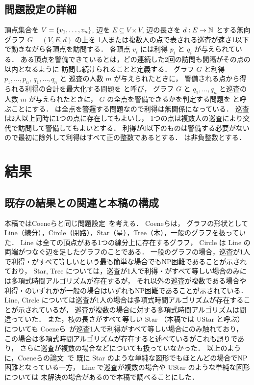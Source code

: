 \subsection{問題設定の詳細}
頂点集合を $V = \left\{{ v_1, \ldots, v_n }\right\}$,
辺を $E \subseteq V \times V$, 
辺の長さを $d : E \to \mathbb{N}$ とする無向グラフ $G = (V,E,d)$ の上を
1人または複数人の点で表される巡査が速さ1以下で動きながら各頂点を訪問する．
各頂点 $v_i$ には利得 $p_i$ と{\timelimit} $q_i$ が与えられている．
ある頂点を警備できているとは，どの連続した2回の訪問も間隔がその点の{\timelimit}以内となるように
訪問し続けられることと定義する．
グラフ $G$ と利得 $p_1, \ldots, p_n$, {\timelimit} $q_1, \ldots, q_n$ と
巡査の人数 $m$ が与えられたときに，
警備される点から得られる利得の合計を最大化する問題を
\optpp と呼び，
グラフ $G$ と{\timelimit} $q_1, \ldots, q_n$ と巡査の人数 $m$ が与えられたときに，
$G$ の全点を警備できるかを判定する問題を \decisionpp と呼ぶことにする．
\decisionpp は全点を警邏する問題なので利得は無関係になっている．
巡査は2人以上同時に1つの点に存在してもよいし，
1つの点は複数人の巡査により交代で訪問して警備してもよいとする．
利得が0以下のものは警備する必要がないので最初に除外して利得はすべて正の整数であるとする．
{\timelimit}は非負整数とする．





\section{結果}


\subsection{既存の結果との関連と本稿の構成}
本稿ではCoeneらと同じ問題設定~\cite{coene2011charlemagne}を考える．
Coeneらは，
グラフの形状としてLine（線分），Circle（閉路），Star（星），Tree（木），一般のグラフを扱っていた．
Line は全ての頂点がある1つの線分上に存在するグラフ，
Circle は Line の両端がつなぐ辺を足したグラフのことである．
一般のグラフの場合，巡査が1人で利得・{\timelimit}がすべて等しいという最も簡単な場合でもNP困難であることが示されており，
Star, Tree については，巡査が1人で利得・{\timelimit}がすべて等しい場合のみには多項式時間アルゴリズムが存在するが，
それ以外の巡査が複数である場合や利得・{\timelimit}のいずれかが一般の場合はいずれもNP困難であることが示されている．
Line, Circle については巡査が1人の場合は多項式時間アルゴリズムが存在することが示されているが，
巡査が複数の場合に対する多項式時間アルゴリズムは間違っていた．
また，枝の長さがすべて等しい Star （本稿では UStar と呼ぶ） についても
Coeneら~\cite{coene2011charlemagne}が巡査1人で利得がすべて等しい場合にのみ触れており，
この場合は多項式時間アルゴリズムが存在すると述べているがこれも誤りであり，
さらに巡査が複数の場合などについても扱っていなかった．
以上のように，Coeneらの論文~\cite{coene2011charlemagne}で
既に Star のような単純な図形でもほとんどの場合でNP困難となっている一方，
Line で巡査が複数の場合や UStar のような単純な図形については
未解決の場合があるので本稿で調べることにした．

